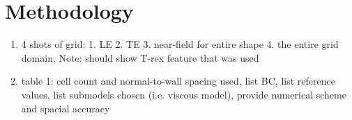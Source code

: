 \section{Methodology}

\begin{enumerate}
	\item 4 shots of grid: 1. LE 2. TE 3. near-field for entire shape 4. the entire grid domain. Note: should show T-rex feature that was used
	\item table 1: cell count and normal-to-wall spacing used, list BC, list reference values, list submodels chosen (i.e. viscous model), provide numerical scheme and spacial accuracy
	
\end{enumerate}